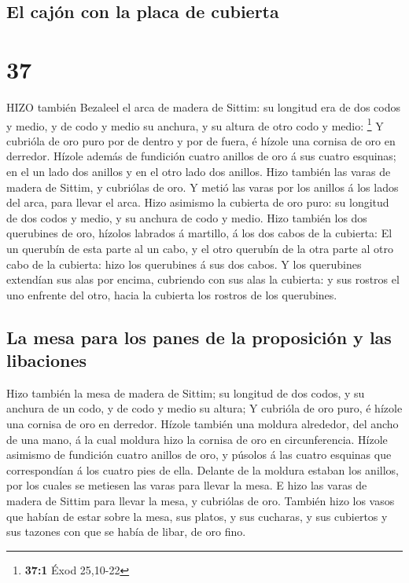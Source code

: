 \hypertarget{el-cajuxf3n-con-la-placa-de-cubierta}{%
\subsection{El cajón con la placa de
cubierta}\label{el-cajuxf3n-con-la-placa-de-cubierta}}

\hypertarget{section-36}{%
\section{37}\label{section-36}}

 HIZO también Bezaleel el arca de madera de Sittim: su
longitud era de dos codos y medio, y de codo y medio su anchura, y su
altura de otro codo y medio: \footnote{\textbf{37:1} Éxod 25,10-22}
 Y cubrióla de oro puro por de dentro y por de fuera, é
hízole una cornisa de oro en derredor.  Hízole además de
fundición cuatro anillos de oro á sus cuatro esquinas; en el un lado dos
anillos y en el otro lado dos anillos.  Hizo también las
varas de madera de Sittim, y cubriólas de oro.  Y metió las
varas por los anillos á los lados del arca, para llevar el arca.
 Hizo asimismo la cubierta de oro puro: su longitud de dos
codos y medio, y su anchura de codo y medio.  Hizo también
los dos querubines de oro, hízolos labrados á martillo, á los dos cabos
de la cubierta:  El un querubín de esta parte al un cabo, y
el otro querubín de la otra parte al otro cabo de la cubierta: hizo los
querubines á sus dos cabos.  Y los querubines extendían sus
alas por encima, cubriendo con sus alas la cubierta: y sus rostros el
uno enfrente del otro, hacia la cubierta los rostros de los querubines.

\hypertarget{la-mesa-para-los-panes-de-la-proposiciuxf3n-y-las-libaciones}{%
\subsection{La mesa para los panes de la proposición y las
libaciones}\label{la-mesa-para-los-panes-de-la-proposiciuxf3n-y-las-libaciones}}

 Hizo también la mesa de madera de Sittim; su longitud de
dos codos, y su anchura de un codo, y de codo y medio su altura;
 Y cubrióla de oro puro, é hízole una cornisa de oro en
derredor.  Hízole también una moldura alrededor, del ancho
de una mano, á la cual moldura hizo la cornisa de oro en circunferencia.
 Hízole asimismo de fundición cuatro anillos de oro, y
púsolos á las cuatro esquinas que correspondían á los cuatro pies de
ella.  Delante de la moldura estaban los anillos, por los
cuales se metiesen las varas para llevar la mesa.  E hizo
las varas de madera de Sittim para llevar la mesa, y cubriólas de oro.
 También hizo los vasos que habían de estar sobre la mesa,
sus platos, y sus cucharas, y sus cubiertos y sus tazones con que se
había de libar, de oro fino.

